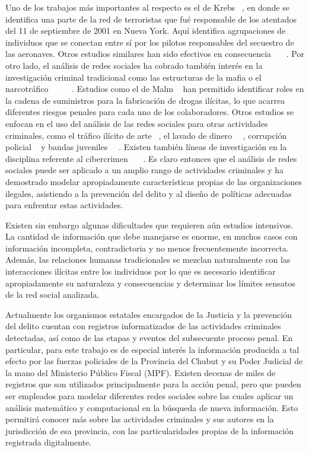 Uno de los trabajos más importantes al respecto es el de Krebs ~\cite{ref_article7}, en donde se identifica una parte de la red de terroristas que fué responsable de los atentados del 11 de septiembre de 2001 en Nueva York. Aquí identifica agrupaciones de individuos que se conectan entre sí por los pilotos responsables del secuestro de las aeronaves. Otros estudios similares han sido efectivos en consecuencia ~\cite{ref_article8}~\cite{ref_article9}~\cite{ref_article10}.  Por otro lado, el análisis de redes sociales ha cobrado también interés en la investigación criminal tradicional como las estructuras de la mafia o el narcotráfico ~\cite{ref_article11}~\cite{ref_article12}~\cite{ref_article13}~\cite{ref_article14}~\cite{ref_article15}. Estudios como el de Malm ~\cite{ref_article16} han permitido identificar roles en la cadena de suministros para la fabricación de drogas ilícitas, lo que acarrea diferentes riesgos penales para cada uno de los colaboradores. Otros estudios se enfocan en el uso del análisis de las redes sociales para otras actividades criminales, como el tráfico ilícito de arte ~\cite{ref_article17}, el lavado de dinero ~\cite{ref_article18}~\cite{ref_article19}, corrupción policial ~\cite{ref_article20} y bandas juveniles ~\cite{ref_article21}~\cite{ref_article22}. Existen también líneas de investigación en la disciplina referente al cibercrimen ~\cite{ref_article23}~\cite{ref_article24}~\cite{ref_article25}. Es claro entonces que el análisis de redes sociales puede ser aplicado a un amplio rango de actividades criminales y ha demostrado modelar apropiadamente características propias de las organizaciones ilegales, asistiendo a la prevención del delito y al diseño de políticas adecuadas para enfrentar estas actividades.

Existen sin embargo algunas dificultades que requieren aún estudios intensivos. La cantidad de información que debe manejarse es enorme, en muchos casos con información incompleta, contradictoria y no menos frecuentemente incorrecta. Además, las relaciones humanas tradicionales se mezclan naturalmente con las interacciones ilícitas entre los individuos por lo que es necesario identificar apropiadamente su naturaleza y consecuencias y determinar los límites sensatos de la red social analizada. 

Actualmente los organismos estatales encargados de la Justicia y la prevención del delito cuentan con registros informatizados de las actividades criminales detectadas, así como de las etapas y eventos del subsecuente proceso penal. En particular, para este trabajo es de especial interés la información producida a tal efecto por las fuerzas policiales de la Provincia del Chubut y su Poder Judicial de la mano del Ministerio Público Fiscal (MPF). Existen decenas de miles de registros que son utilizados principalmente para la acción penal, pero que pueden ser empleados para modelar diferentes redes sociales sobre las cuales aplicar un análisis matemático y computacional en la búsqueda de nueva información. Esto permitirá conocer más sobre las actividades criminales y sus autores en la jurisdicción de esa provincia, con las particularidades propias de la información registrada digitalmente.


